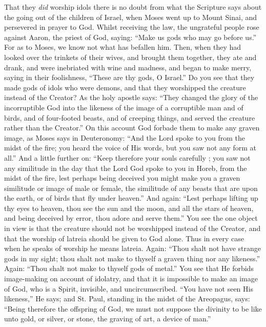 \documentclass[10pt]{book}
\newcommand{\switchEnglish}{\selectlanguage{english} \switchcolumn}
\begin{document}
\begin{paracol}{2}
\switchEnglish

That they \emph{did} worship idols there is no 
doubt from what the Scripture says about the 
going out of the children of Israel, when Moses 
went up to Mount Sinai, and persevered in 
prayer to God. Whilst receiving the law, the 
ungrateful people rose against Aaron, the 
priest of God, saying: ``Make us gods who 
may go before us.'' For as to Moses, we know 
not what has befallen him. Then, when they 
had looked over the trinkets of their wives, and 
brought them together, they ate and drank, 
and were inebriated with wine and madness, 
and began to make merry, saying in their 
foolishness, ``These are thy gods, O Israel.''
Do you see that they made gods of idols who 
were demons, and that they worshipped the 
creature instead of the Creator? As the holy 
apostle says: ``They changed the glory of the 
incorruptible God into the likeness of the 
image of a corruptible man and of birds, and 
of four-footed beasts, and of creeping things, 
and served the creature rather than the 
Creator.'' On this account God forbade them to 
make any graven image, as Moses says in 
Deuteronomy: ``And the Lord spoke to you 
from the midst of the fire; you heard the voice 
of His words, but you saw not any form at 
all.'' And a little further on: ``Keep therefore 
your souls carefully ; you saw not any similitude
in the day that the Lord God spoke to 
you in Horeb, from the midst of the fire, lest 
perhaps being deceived you might make you 
a graven similitude or image of male or female, 
the similitude of any beasts that are upon the 
earth, or of birds that fly under heaven.''
And again: ``Lest perhaps lifting up thy eyes to 
heaven, thou see the sun and the moon, and 
all the stars of heaven, and being deceived by 
error, thou adore and serve them.''
You see the one object in view is that the creature 
should not be worshipped instead of the 
Creator, and that the worship of latreia should 
be given to God alone. Thus in every case 
when he speaks of worship he means latreia. 
Again: ``Thou shalt not have strange gods in 
my sight; thou shalt not make to thyself a 
graven thing nor any likeness.''
Again: ``Thou shalt not make to thyself gods of metal.''
You see that He forbids image-making on 
account of idolatry, and that it is impossible 
to make an image of God, who is a Spirit, 
invisible, and uncircumscribed. ``You have 
not seen His likeness,'' He says; and St. Paul, 
standing in the midst of the Areopagus, says: 
``Being therefore the offspring of God, we must 
not suppose the divinity to be like unto gold, 
or silver, or stone, the graving of art, a device 
of man.''


\end{paracol}
\end{document}
